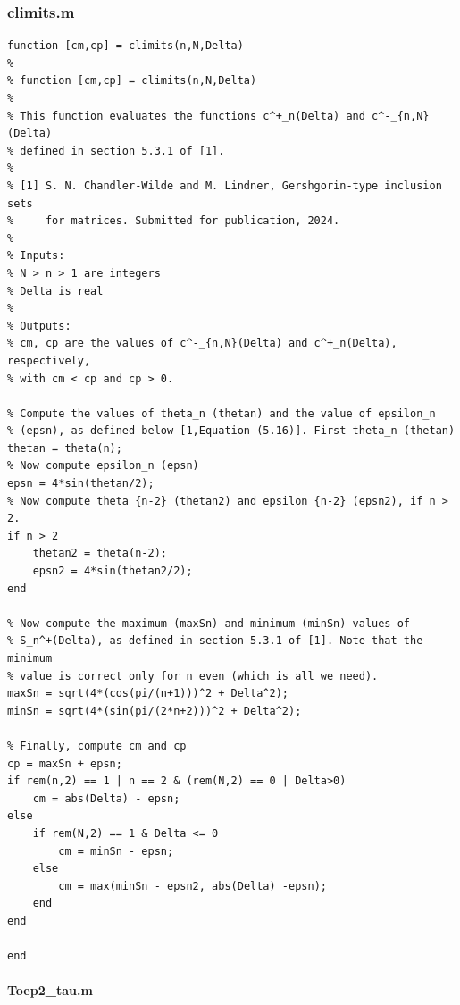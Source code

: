 \documentclass[preprint,1p,11pt]{elsarticle}
\numberwithin{equation}{section}   %
\numberwithin{figure}{section}  %
\begin{document}
\subsubsection{climits.m} \label{code:climits}
\begin{verbatim}
function [cm,cp] = climits(n,N,Delta)
%
% function [cm,cp] = climits(n,N,Delta)
%
% This function evaluates the functions c^+_n(Delta) and c^-_{n,N}(Delta)
% defined in section 5.3.1 of [1].
% 
% [1] S. N. Chandler-Wilde and M. Lindner, Gershgorin-type inclusion sets
%     for matrices. Submitted for publication, 2024.
%
% Inputs:
% N > n > 1 are integers
% Delta is real
%
% Outputs:
% cm, cp are the values of c^-_{n,N}(Delta) and c^+_n(Delta), respectively,
% with cm < cp and cp > 0.

% Compute the values of theta_n (thetan) and the value of epsilon_n 
% (epsn), as defined below [1,Equation (5.16)]. First theta_n (thetan)
thetan = theta(n);
% Now compute epsilon_n (epsn)
epsn = 4*sin(thetan/2);
% Now compute theta_{n-2} (thetan2) and epsilon_{n-2} (epsn2), if n > 2.
if n > 2
    thetan2 = theta(n-2);
    epsn2 = 4*sin(thetan2/2);
end

% Now compute the maximum (maxSn) and minimum (minSn) values of 
% S_n^+(Delta), as defined in section 5.3.1 of [1]. Note that the minimum 
% value is correct only for n even (which is all we need).
maxSn = sqrt(4*(cos(pi/(n+1)))^2 + Delta^2);
minSn = sqrt(4*(sin(pi/(2*n+2)))^2 + Delta^2);

% Finally, compute cm and cp
cp = maxSn + epsn;
if rem(n,2) == 1 | n == 2 & (rem(N,2) == 0 | Delta>0)
    cm = abs(Delta) - epsn;
else
    if rem(N,2) == 1 & Delta <= 0
        cm = minSn - epsn;
    else
        cm = max(minSn - epsn2, abs(Delta) -epsn);
    end
end

end
\end{verbatim}

\paragraph{Toep2\_tau.m}
\end{document}
